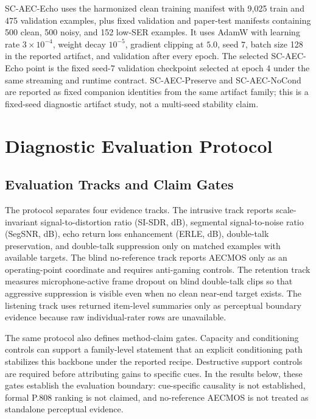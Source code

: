 \documentclass[journal]{IEEEtran}
\begin{document}
SC-AEC-Echo uses the harmonized clean training manifest with 9,025 train and 475 validation examples, plus fixed validation and paper-test manifests containing 500 clean, 500 noisy, and 152 low-SER examples. It uses AdamW with learning rate $3\times10^{-4}$, weight decay $10^{-5}$, gradient clipping at $5.0$, seed $7$, batch size 128 in the reported artifact, and validation after every epoch. The selected SC-AEC-Echo point is the fixed seed-7 validation checkpoint selected at epoch 4 under the same streaming and runtime contract. SC-AEC-Preserve and SC-AEC-NoCond are reported as fixed companion identities from the same artifact family; this is a fixed-seed diagnostic artifact study, not a multi-seed stability claim.



\section{Diagnostic Evaluation Protocol}
\subsection{Evaluation Tracks and Claim Gates}
The protocol separates four evidence tracks. The intrusive track reports scale-invariant signal-to-distortion ratio (SI-SDR, dB), segmental signal-to-noise ratio (SegSNR, dB), echo return loss enhancement (ERLE, dB), double-talk preservation, and double-talk suppression only on matched examples with available targets. The blind no-reference track reports AECMOS only as an operating-point coordinate and requires anti-gaming controls. The retention track measures microphone-active frame dropout on blind double-talk clips so that aggressive suppression is visible even when no clean near-end target exists. The listening track uses returned item-level summaries only as perceptual boundary evidence because raw individual-rater rows are unavailable.

The same protocol also defines method-claim gates. Capacity and conditioning controls can support a family-level statement that an explicit conditioning path stabilizes this backbone under the reported recipe. Destructive support controls are required before attributing gains to specific cues. In the results below, these gates establish the evaluation boundary: cue-specific causality is not established, formal P.808 ranking is not claimed, and no-reference AECMOS is not treated as standalone perceptual evidence.
\end{document}
